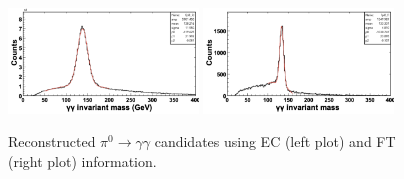 \begin{figure}
\includegraphics[width=0.45\textwidth]{pics/pi0mass.png}
\includegraphics[width=0.45\textwidth]{pics/pi0mass2.png}
\caption{Reconstructed $\pi^{0}\rightarrow \gamma \gamma$ candidates using EC (left plot) and FT (right plot) information.
}
\label{fig:pi0mass}
\end{figure}

